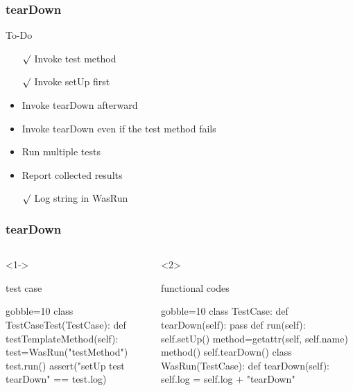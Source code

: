 \documentclass[lualatex]{beamer}
\begin{document}
\begin{frame}
  \frametitle{tearDown}

  \begin{block}{To-Do}
    \begin{itemize}
    \item[$\surd$] Invoke test method
    \item[$\surd$] Invoke setUp first 
    \item Invoke tearDown afterward 
    \item Invoke tearDown even if the test method fails 
    \item Run multiple tests 
    \item Report collected results 
    \item[$\surd$] Log string in WasRun 
    \end{itemize}
  \end{block}
\end{frame}

\begin{frame}[fragile,t]
  \frametitle{tearDown}

  \begin{columns}[t]
    \small
    \begin{onlyenv}<1->
      \begin{block}{test case}
        \begin{pythoncode*}{gobble=10}
          class TestCaseTest(TestCase):
            def testTemplateMethod(self):
              test=WasRun("testMethod")
              test.run()
              assert("setUp test tearDown"
                == test.log)
        \end{pythoncode*}
      \end{block}
    \end{onlyenv}

    \begin{onlyenv}<2>
      \begin{block}{functional codes}
        \begin{pythoncode*}{gobble=10}
          class TestCase:
            def tearDown(self):
              pass
            def run(self):
              self.setUp()
              method=getattr(self, self.name)
              method()
              self.tearDown()
          class WasRun(TestCase):
            def tearDown(self):
              self.log = self.log + "tearDown"
        \end{pythoncode*}
      \end{block}
    \end{onlyenv}
    \end{columns}
\end{frame}
\end{document}
